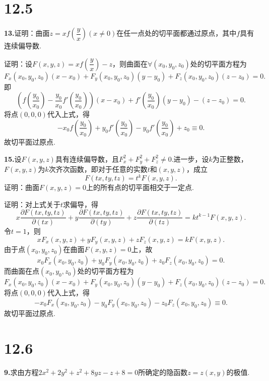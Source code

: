 \documentclass[12pt, a4paper]{article}
\begin{document}
\section*{12.5}
\textbf{13.}证明：曲面\(z = xf\left(\dfrac{y}{x}\right)(x \neq 0)\)在任一点处的切平面都通过原点，其中\(f\)具有连续偏导数.

证明：设\(F(x, y, z) = xf\left(\dfrac{y}{x}\right) - z\)，则曲面在\(\forall (x_0, y_0, z_0)\)处的切平面方程为
\[F_x(x_0, y_0, z_0)(x - x_0) + F_y(x_0, y_0, z_0)(y - y_0) + F_z(x_0, y_0, z_0)(z - z_0) = 0.\]
即
\[\left(f\left(\frac{y_0}{x_0}\right) - \frac{y_0}{x_0}f'\left(\frac{y_0}{x_0}\right)\right)(x - x_0) + f'\left(\frac{y_0}{x_0}\right)(y - y_0) - (z - z_0) = 0.\]
将点\((0, 0, 0)\)代入上式，得
\[-x_0f\left(\frac{y_0}{x_0}\right) + y_0f'\left(\frac{y_0}{x_0}\right) - y_0f'\left(\frac{y_0}{x_0}\right) + z_0 \equiv 0.\]
故切平面过原点.

\textbf{15.}设\(F(x, y, z)\)具有连续偏导数，且\(F_x^2 + F_y^2 + F_z^2 \neq 0\).进一步，设\(k\)为正整数，\(F(x, y, z)\)为\(k\)次齐次函数，即对于任意的实数\(t\)和\((x, y, z)\)，成立
\[F(tx, ty, tz) = t^k F(x, y, z).\]
证明：曲面\(F(x, y, z) = 0\)上的所有点的切平面相交于一定点.

证明：对上式关于\(t\)求偏导，得
\[x\frac{\partial F(tx, ty, tz)}{\partial (tx)} + y\frac{\partial F(tx, ty, tz)}{\partial (ty)} + z\frac{\partial F(tx, ty, tz)}{\partial (tz)} = k t^{k-1} F(x, y, z).\]
令\(t = 1\)，则
\[xF_x(x, y, z) + yF_y(x, y, z) + zF_z(x, y, z) = k F(x, y, z).\]
由于点\((x_0, y_0, z_0)\)在曲面\(F(x, y, z) = 0\)上，故
\[x_0F_x(x_0, y_0, z_0) + y_0F_y(x_0, y_0, z_0) + z_0F_z(x_0, y_0, z_0) = 0.\]
而曲面在点\((x_0, y_0, z_0)\)处的切平面方程为
\[F_x(x_0, y_0, z_0)(x - x_0) + F_y(x_0, y_0, z_0)(y - y_0) + F_z(x_0, y_0, z_0)(z - z_0) = 0.\]
将点\((0, 0, 0)\)代入上式，得
\[-x_0F_x(x_0, y_0, z_0) - y_0F_y(x_0, y_0, z_0) - z_0F_z(x_0, y_0, z_0) \equiv 0.\]
故切平面过原点.

\section*{12.6}
\textbf{9.}求由方程\(2x^2 + 2y^2 + z^2 + 8yz - z + 8 = 0\)所确定的隐函数\(z = z(x, y)\)的极值.
\end{document}
